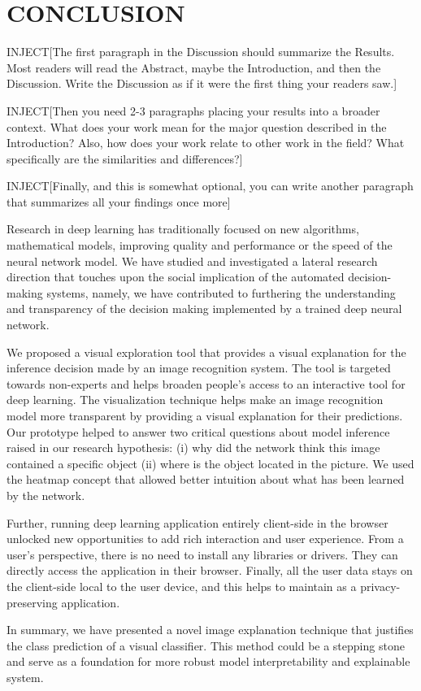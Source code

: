 %
%

\chapter{CONCLUSION}
\thispagestyle{empty}

INJECT[The first paragraph in the Discussion should summarize the Results. Most readers will read the Abstract, maybe the Introduction, and then the Discussion. Write the Discussion as if it were the first thing your readers saw.]

INJECT[Then you need 2-3 paragraphs placing your results into a broader context. What does your work mean for the major question described in the Introduction? Also, how does your work relate to other work in the field? What specifically are the similarities and differences?]

INJECT[Finally, and this is somewhat optional, you can write another paragraph that summarizes all your findings once more]

Research in deep learning has traditionally focused on new algorithms, mathematical models, improving quality and performance or the speed of the neural network model. We have studied and investigated a lateral research direction that touches upon the social implication of the automated decision-making systems, namely, we have contributed to furthering the understanding and transparency of the decision making implemented by a trained deep neural network. 

We proposed a visual exploration tool that provides a visual explanation for the inference decision made by an image recognition system. The tool is targeted towards non-experts and helps broaden people's access to an interactive tool for deep learning. The visualization technique helps make an image recognition model more transparent by providing a visual explanation for their predictions. Our prototype helped to answer two critical questions about model inference raised in our research hypothesis: (i) why did the network think this image contained a specific object (ii) where is the object located in the picture. We used the heatmap concept that allowed better intuition about what has been learned by the network.

Further, running deep learning application entirely client-side in the browser unlocked new opportunities to add rich interaction and user experience. From a user's perspective, there is no need to install any libraries or drivers. They can directly access the application in their browser. Finally, all the user data stays on the client-side local to the user device, and this helps to maintain as a privacy-preserving application.

In summary, we have presented a novel image explanation technique that justifies the class prediction of a visual classifier. This method could be a  stepping stone and serve as a foundation for more robust model interpretability and explainable system.





